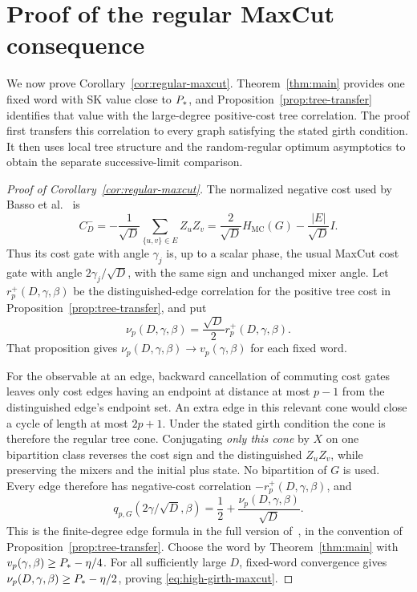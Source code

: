 \section{Proof of the regular MaxCut consequence}
\label{sec:regular-maxcut-proof}

We now prove Corollary~\ref{cor:regular-maxcut}. Theorem~\ref{thm:main}
provides one fixed word with SK value close to $P_*$, and
Proposition~\ref{prop:tree-transfer} identifies that value with the
large-degree positive-cost tree correlation. The proof first transfers
this correlation to every graph satisfying the stated girth condition.
It then uses local tree structure and the random-regular optimum
asymptotics to obtain the separate successive-limit comparison.

\begin{proof}[Proof of Corollary~\ref{cor:regular-maxcut}]
The normalized negative cost used by Basso et al.~\cite{BFMVZ2022} is
\[
 C_D^-=-\frac1{\sqrt D}\sum_{\{u,v\}\in E}Z_uZ_v
      =\frac2{\sqrt D}H_{\mathrm{MC}}(G)
       -\frac{|E|}{\sqrt D}I.
\]
Thus its cost gate with angle $\gamma_j$ is, up to a scalar phase, the usual
MaxCut cost gate with angle $2\gamma_j/\sqrt D$, with the same sign and
unchanged mixer angle.  Let $r_p^+(D,\gamma,\beta)$ be the distinguished-edge
correlation for the positive tree cost in
Proposition~\ref{prop:tree-transfer}, and put
\[
 \nu_p(D,\gamma,\beta)=\frac{\sqrt D}{2}r_p^+(D,\gamma,\beta).
\]
That proposition gives $\nu_p(D,\gamma,\beta)\to v_p(\gamma,\beta)$ for
each fixed word.

For the observable at an edge, backward cancellation of commuting cost
gates leaves only cost edges having an endpoint at distance at most $p-1$
from the distinguished edge's endpoint set.  An extra edge in this
relevant cone would close a cycle of length at most $2p+1$.  Under the
stated girth condition the cone is therefore the regular tree cone.
Conjugating \emph{only this cone} by $X$ on one bipartition class reverses
the cost sign and the distinguished $Z_uZ_v$, while preserving the mixers
and the initial plus state.  No bipartition of $G$ is used.  Every edge
therefore has negative-cost correlation $-r_p^+(D,\gamma,\beta)$, and
\begin{equation}\label{eq:regular-tree-cut}
 q_{p,G}(2\gamma/\sqrt D,\beta)
 =\frac12+\frac{\nu_p(D,\gamma,\beta)}{\sqrt D}.
\end{equation}
This is the finite-degree edge formula in the full version
of~\cite[Equations~(2.3)--(2.6) and (3.1)]{BFMVZ2022}, in the convention
of Proposition~\ref{prop:tree-transfer}.  Choose the word by
Theorem~\ref{thm:main} with $v_p(\gamma,\beta)\ge P_*-\eta/4$.
For all sufficiently large $D$, fixed-word convergence gives
$\nu_p(D,\gamma,\beta)\ge P_*-\eta/2$, proving
\eqref{eq:high-girth-maxcut}.


\end{proof}
